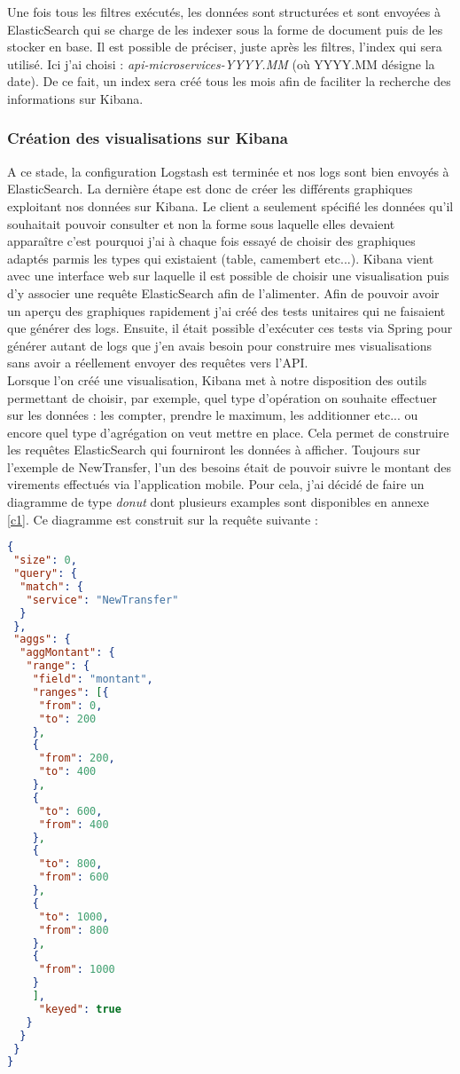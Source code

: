 	Une fois tous les filtres exécutés, les données sont structurées et sont envoyées à ElasticSearch qui se charge de les indexer sous la forme de document puis de les stocker en base. Il est possible de préciser, juste après les filtres, l'index qui sera utilisé. Ici j'ai choisi : \textit{api-microservices-YYYY.MM} (où YYYY.MM désigne la date). De ce fait, un index sera créé tous les mois afin de faciliter la recherche des informations sur Kibana. 
	
	\subsubsection{Création des visualisations sur Kibana}
	
	A ce stade, la configuration Logstash est terminée et nos logs sont bien envoyés à ElasticSearch. La dernière étape est donc de créer les différents graphiques exploitant nos données sur Kibana. Le client a seulement spécifié les données qu'il souhaitait pouvoir consulter et non la forme sous laquelle elles devaient apparaître c'est pourquoi j'ai à chaque fois essayé de choisir des graphiques adaptés parmis les types qui existaient (table, camembert etc...). Kibana vient avec une interface web sur laquelle il est possible de choisir une visualisation puis d'y associer une requête ElasticSearch afin de l'alimenter. Afin de pouvoir avoir un aperçu des graphiques rapidement j'ai créé des tests unitaires qui ne faisaient que générer des logs. Ensuite, il était possible d'exécuter ces tests via Spring pour générer autant de logs que j'en avais besoin pour construire mes visualisations sans avoir a réellement envoyer des requêtes vers l'API. \\
	
	Lorsque l'on créé une visualisation, Kibana met à notre disposition des outils permettant de choisir, par exemple, quel type d'opération on souhaite effectuer sur les données : les compter, prendre le maximum, les additionner etc... ou encore quel type d'agrégation on veut mettre en place. Cela permet de construire les requêtes ElasticSearch qui fourniront les données à afficher. Toujours sur l'exemple de NewTransfer, l'un des besoins était de pouvoir suivre le montant des virements effectués via l'application mobile. Pour cela, j'ai décidé de faire un diagramme de type \textit{donut} dont plusieurs examples sont disponibles en annexe \ref{c1}. Ce diagramme est construit sur la requête suivante :
	
\begin{lstlisting}[language=json]
{
 "size": 0,
 "query": {
  "match": {
   "service": "NewTransfer"
  }
 },
 "aggs": {
  "aggMontant": {
   "range": {
    "field": "montant",
	"ranges": [{
	 "from": 0,
	 "to": 200
	},
	{
	 "from": 200,
	 "to": 400
	},
	{
	 "to": 600,
	 "from": 400
	},
	{
	 "to": 800,
	 "from": 600
	},
	{
	 "to": 1000,
	 "from": 800
	},
	{
	 "from": 1000
	}
	],
	 "keyed": true
   }
  }
 }
}	
\end{lstlisting}


